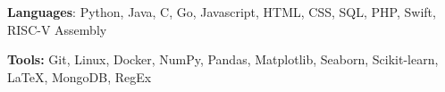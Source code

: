 \documentclass{article}
\begin{document}
    


    \begin{adjustwidth}{1em}{1em}
        
        \textbf{Languages}: Python, Java, C, Go, Javascript, HTML, CSS, SQL, PHP, Swift, RISC-V Assembly
    
        \vspace{1mm}

        \textbf{Tools:} Git, Linux, Docker, NumPy, Pandas, Matplotlib, Seaborn, Scikit-learn, \LaTeX, MongoDB, RegEx

    \end{adjustwidth}



    
\end{document}
